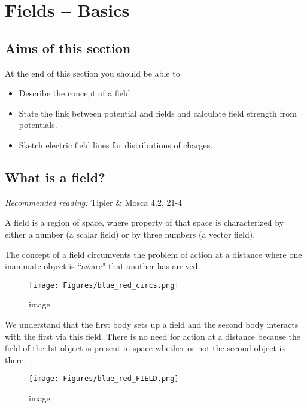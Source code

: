 \documentclass[
]{book}
\theoremstyle{definition}
\theoremstyle{definition}
\theoremstyle{definition}
\theoremstyle{definition}
\theoremstyle{remark}
\begin{document}
\hypertarget{fields-basics}{%
\chapter{Fields -- Basics}\label{fields-basics}}

\hypertarget{aims-of-this-section}{%
\section*{Aims of this section}\label{aims-of-this-section}}

At the end of this section you should be able to

\begin{itemize}
\item
  Describe the concept of a field
\item
  State the link between potential and fields and calculate field
  strength from potentials.
\item
  Sketch electric field lines for distributions of charges.
\end{itemize}

\hypertarget{what-is-a-field}{%
\section{What is a field?}\label{what-is-a-field}}

\emph{Recommended reading:} Tipler \& Mosca 4.2, 21-4

A field is a region of space, where property of that space is
characterized by either a number (a scalar field) or by three numbers (a
vector field).

The concept of a field circumvents the problem of action at a distance
where one inanimate object is ``aware" that another has arrived.

\begin{figure}
\centering
\texttt{[image: Figures/blue\_red\_circs.png]}
\caption{image}
\end{figure}

We understand that the first body sets up a field and the second body
interacts with the first via this field. There is no need for action at
a distance because the field of the 1st object is present in space
whether or not the second object is there.

\begin{figure}
\centering
\texttt{[image: Figures/blue\_red\_FIELD.png]}
\caption{image}
\end{figure}
\end{document}
